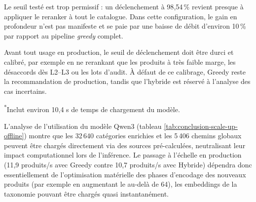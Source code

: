 \documentclass[12pt,a4paper]{report}
\begin{document}
Le seuil testé est trop permissif : un déclenchement à 98{,}54\,\% revient presque à appliquer le reranker à tout le catalogue. Dans cette configuration, le gain en profondeur n'est pas manifeste et se paie par une baisse de débit d'environ 10\,\% par rapport au pipeline \textit{greedy} complet.

Avant tout usage en production, le seuil de déclenchement doit être durci et calibré, par exemple en ne rerankant que les produits à très faible marge, les désaccords dès L2--L3 ou les lots d'audit. À défaut de ce calibrage, Greedy reste la recommandation de production, tandis que l'hybride est réservé à l'analyse des cas incertains.

\begin{table}[H]
    \centering
    \caption{Coût de préparation des embeddings Qwen3 partagés (batch size = 64)}
    \label{tab:conclusion-scale-up-offline}
    \vspace{1ex}
    \footnotesize{\textsuperscript{*}Inclut environ 10{,}4 s de temps de chargement du modèle.}
\end{table}

L'analyse de l'utilisation du modèle Qwen3 (tableau \ref{tab:conclusion-scale-up-offline}) montre que les 32\,640 catégories enrichies et les 5\,406 chemins globaux peuvent être chargés directement via des sources pré-calculées, neutralisant leur impact computationnel lors de l'inférence. Le passage à l'échelle en production (11{,}9 produits/s avec Greedy contre 10{,}7 produits/s avec Hybride) dépendra donc essentiellement de l'optimisation matérielle des phases d'encodage des nouveaux produits (par exemple en augmentant le au-delà de 64), les embeddings de la taxonomie pouvant être chargés quasi instantanément.
\end{document}
